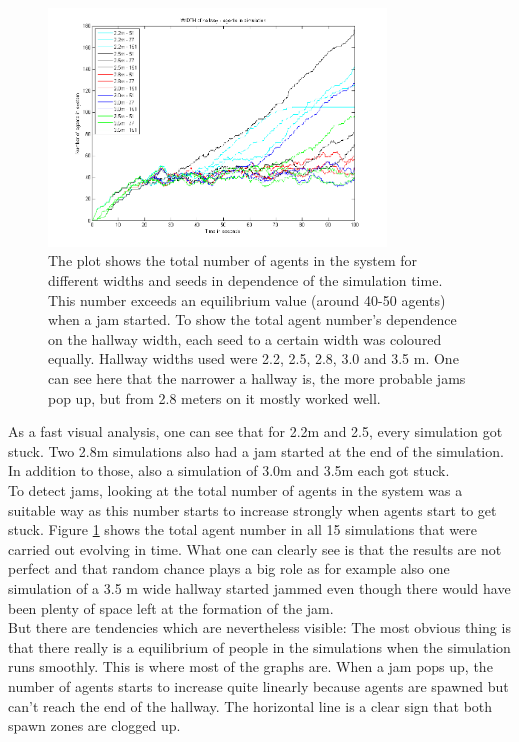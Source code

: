 
\begin{figure}[h!]
	\centering
		\includegraphics[width=0.80\textwidth]{pictures/AallInOne.png}
	\caption{The plot shows the total number of agents in the system for different widths and seeds in dependence of the simulation time. This number exceeds an equilibrium value (around 40-50 agents) when a jam started. To show the total agent number's dependence on the hallway width, each seed to a certain width was coloured equally. Hallway widths used were 2.2, 2.5, 2.8, 3.0 and 3.5 m. One can see here that the narrower a hallway is, the more probable jams pop up, but from 2.8 meters on it mostly worked well.}
	\label{fig:WidthAllInOne}
\end{figure}

\noi As a fast visual analysis, one can see that for 2.2m and 2.5, every simulation got stuck. Two 2.8m simulations also had a jam started at the end of the simulation. In addition to those, also a simulation of 3.0m and 3.5m each got stuck.\\

\noi To detect jams, looking at the total number of agents in the system was a suitable way as this number starts to increase strongly when agents start to get stuck. Figure \ref{fig:WidthAllInOne} shows the total agent number in all 15 simulations that were carried out evolving in time. What one can clearly see is that the results are not perfect and that random chance plays a big role as for example also one simulation of a 3.5 m wide hallway started jammed even though there would have been plenty of space left at the formation of the jam.\\
But there are tendencies which are nevertheless visible: The most obvious thing is that there really is a equilibrium of people in the simulations when the simulation runs smoothly. This is where most of the graphs are. When a jam pops up, the number of agents starts to increase quite linearly because agents are spawned but can't reach the end of the hallway. The horizontal line is a clear sign that both spawn zones are clogged up.\\

